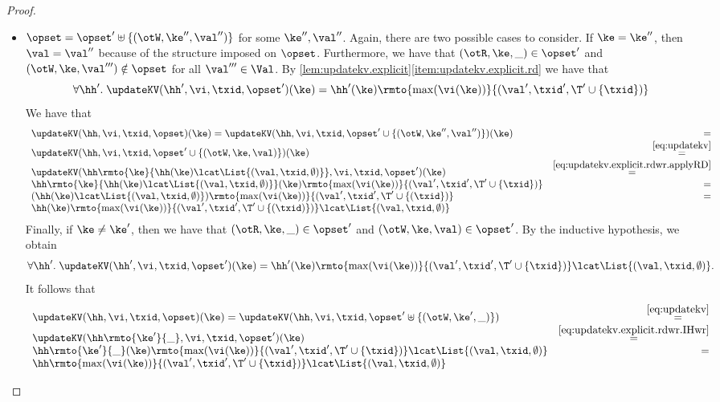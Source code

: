 \begin{proof}
\begin{enumerate}
\begin{itemize}
			\item $\opset = \opset' \uplus \{(\otW, \ke'', \val'')\}$ for some $\ke'', \val''$. Again, 
			there are two possible cases to consider. If $\ke = \ke''$, then $\val = \val''$ because of the structure imposed on $\opset$.
			Furthermore, we have that 
			$(\otR, \ke, \_) \in \opset'$ and $(\otW, \ke, \val''') \notin \opset$ for all $\val''' \in \Val$.
			By \cref{lem:updatekv.explicit}\eqref{item:updatekv.explicit.rd} we have that 
			\begin{equation}
			\forall \hh'.\;\updateKV(\hh', \vi, \txid, \opset')(\ke) = \hh'(\ke)\rmto{\max(\vi(\ke))}{(\val', \txid', \T' \cup \{\txid\})}
			\label{eq:updatekv.explicit.rdwr.applyRD}
			\end{equation}
			We have that 
			\[
			\begin{array}{lr}
			\updateKV(\hh,\vi,\txid, \opset)(\ke) = \updateKV(\hh, \vi, \txid, \opset' \cup \{(\otW, \ke'', \val'')\})(\ke) &= \\
			\updateKV(\hh,\vi, \txid, \opset' \cup \{(\otW, \ke, \val)\})(\ke) &\stackrel{\eqref{eq:updatekv}}{=}\\
			\updateKV(\hh\rmto{\ke}{\hh(\ke) \lcat \List{(\val, \txid, \emptyset)}}, \vi, \txid, \opset')(\ke) &\stackrel{\eqref{eq:updatekv.explicit.rdwr.applyRD}}{=}\\
			\hh\rmto{\ke}{\hh(\ke) \lcat \List{(\val, \txid, \emptyset)}}(\ke)\rmto{\max(\vi(\ke))}{(\val', \txid', \T' \cup \{\txid\})} &=\\
			(\hh(\ke) \lcat\List{(\val, \txid, \emptyset)})\rmto{\max(\vi(\ke))}{(\val', \txid', \T' \cup \{(\txid\})} &=\\
			\hh(\ke)\rmto{\max(\vi(\ke))}{(\val',\txid', \T' \cup \{(\txid)\})} \lcat \List{(\val, \txid, \emptyset)}
			\end{array}
			\]
			Finally, if $\ke \neq \ke'$, then we have that $(\otR, \ke, \_) \in \opset'$ and $(\otW, \ke, \val) \in \opset'$. 
			By the inductive hypothesis, we obtain 
			\begin{equation}
			\forall \hh'.\;\updateKV(\hh', \vi, \txid, \opset')(\ke) = \hh'(\ke)\rmto{\max(\vi(\ke))}{(\val', \txid', \T' \cup \{\txid\})} \lcat \List{(\val, \txid, \emptyset)}.
			\label{eq:updatekv.explicit.rdwr.IHwr}
			\end{equation}
			It follows that 
			\[
			\begin{array}{lr}
			\updateKV(\hh, \vi, \txid, \opset)(\ke) = \updateKV(\hh, \vi, \txid, \opset' \uplus \{(\otW, \ke', \_)\}) &\stackrel{\eqref{eq:updatekv}}{=}\\
			\updateKV(\hh\rmto{\ke'}{\_}, \vi, \txid, \opset')(\ke) &\stackrel{\eqref{eq:updatekv.explicit.rdwr.IHwr}}{=}\\
			\hh\rmto{\ke'}{\_}(\ke)\rmto{\max(\vi(\ke))}{(\val', \txid', \T' \cup \{\txid\})} \lcat \List{(\val, \txid, \emptyset)} &=\\
			\hh\rmto{\max(\vi(\ke))}{(\val', \txid', \T' \cup \{\txid\})} \lcat \List{(\val, \txid, \emptyset)}
			\end{array}
			\]
			\end{itemize}
\end{enumerate}
\end{proof}
